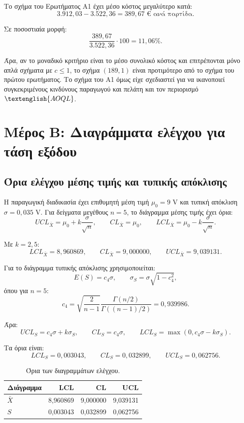 \documentclass[12pt,a4paper]{article}
\newcommand{\AOQL}{\textenglish{AOQL}}
\begin{document}
Το σχήμα του Ερωτήματος Α1 έχει μέσο κόστος μεγαλύτερο κατά:
\[
    3.912{,}03-3.522{,}36 = 389{,}67 \text{ € ανά παρτίδα}.
\]

Σε ποσοστιαία μορφή:
\[
    \frac{389{,}67}{3.522{,}36}\cdot 100 = 11{,}06\%.
\]

Άρα, αν το μοναδικό κριτήριο είναι το μέσο συνολικό κόστος και επιτρέπονται
μόνο απλά σχήματα με \(c\le 1\), το σχήμα \((189,1)\) είναι προτιμότερο από το
σχήμα του πρώτου ερωτήματος. Το σχήμα του Α1 όμως είχε σχεδιαστεί για να
ικανοποιεί συγκεκριμένους κινδύνους παραγωγού και πελάτη και τον περιορισμό
\(\AOQL\).

\newpage

\section{Μέρος Β: Διαγράμματα ελέγχου για τάση εξόδου}

\subsection{Όρια ελέγχου μέσης τιμής και τυπικής απόκλισης}

Η παραγωγική διαδικασία έχει επιθυμητή μέση τιμή \(\mu_0=9\) V και τυπική
απόκλιση \(\sigma=0{,}035\) V. Για δείγματα μεγέθους \(n=5\), το διάγραμμα
μέσης τιμής έχει όρια:
\[
    UCL_{\bar X}=\mu_0+k\frac{\sigma}{\sqrt{n}},
    \qquad
    CL_{\bar X}=\mu_0,
    \qquad
    LCL_{\bar X}=\mu_0-k\frac{\sigma}{\sqrt{n}}.
\]

Με \(k=2{,}5\):
\[
    LCL_{\bar X}=8{,}960869,\qquad
    CL_{\bar X}=9{,}000000,\qquad
    UCL_{\bar X}=9{,}039131.
\]

Για το διάγραμμα τυπικής απόκλισης χρησιμοποιείται:
\[
    E(S)=c_4\sigma,
    \qquad
    \sigma_S=\sigma\sqrt{1-c_4^2},
\]
όπου για \(n=5\):
\[
    c_4=\sqrt{\frac{2}{n-1}}\frac{\Gamma(n/2)}{\Gamma((n-1)/2)}
    =0{,}939986.
\]

Άρα:
\[
    UCL_S=c_4\sigma+k\sigma_S,
    \qquad
    CL_S=c_4\sigma,
    \qquad
    LCL_S=\max(0,c_4\sigma-k\sigma_S).
\]

Τα όρια είναι:
\[
    LCL_S=0{,}003043,\qquad
    CL_S=0{,}032899,\qquad
    UCL_S=0{,}062756.
\]

\begin{table}[H]
\centering
\caption{Όρια των διαγραμμάτων ελέγχου.}
\begin{tabular}{lrrr}
\toprule
\textbf{Διάγραμμα} & \textbf{LCL} & \textbf{CL} & \textbf{UCL} \\
\midrule
\(\bar X\) & 8,960869 & 9,000000 & 9,039131 \\
\(S\) & 0,003043 & 0,032899 & 0,062756 \\
\bottomrule
\end{tabular}
\end{table}
\end{document}

